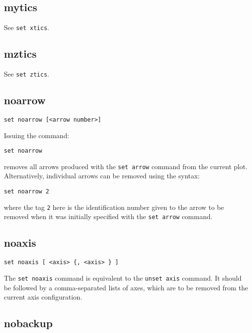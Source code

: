 \subsection{mytics}

See {\tt set xtics}.


\subsection{mztics}

See {\tt set ztics}.


\subsection{noarrow}

\begin{verbatim}
set noarrow [<arrow number>]
\end{verbatim}

Issuing the command:

\begin{verbatim}
set noarrow
\end{verbatim}

\noindent removes all arrows produced with the {\tt set arrow} command from the
current plot. Alternatively, individual arrows can be removed using the syntax:

\begin{verbatim}
set noarrow 2
\end{verbatim}

\noindent where the tag {\tt 2} here is the identification number given to
the arrow to be removed when it was initially specified with the {\tt set arrow}
command.


\subsection{noaxis}

\begin{verbatim}
set noaxis [ <axis> {, <axis> } ]
\end{verbatim}

The {\tt set noaxis} command is equivalent to the {\tt unset axis} command. It
should be followed by a comma-separated lists of axes, which are to be removed
from the current axis configuration.


\subsection{nobackup}

